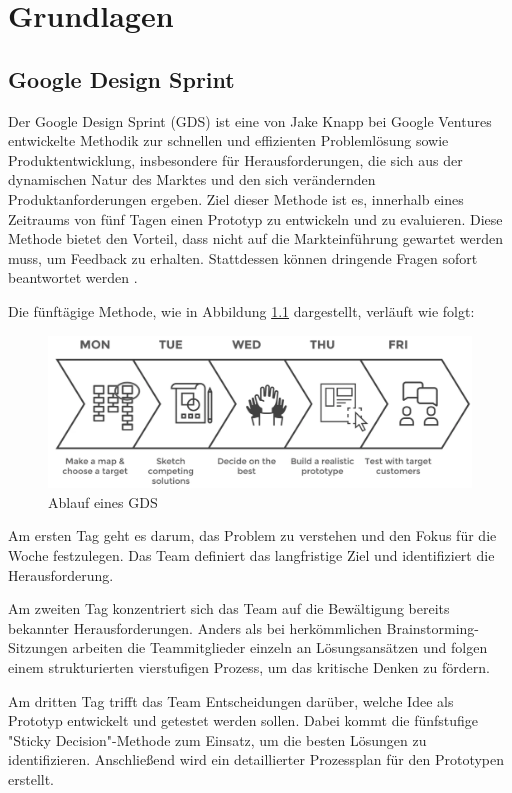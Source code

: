 \chapter{Grundlagen}

\section{Google Design Sprint}

Der Google Design Sprint (GDS) ist eine von Jake Knapp bei Google Ventures entwickelte Methodik zur schnellen und effizienten Problemlösung sowie Produktentwicklung, insbesondere für Herausforderungen, die sich aus der dynamischen Natur des Marktes und den sich verändernden Produktanforderungen ergeben. 
Ziel dieser Methode ist es, innerhalb eines Zeitraums von fünf Tagen einen Prototyp zu entwickeln und zu evaluieren. 
Diese Methode bietet den Vorteil, dass nicht auf die Markteinführung gewartet werden muss, um Feedback zu erhalten. Stattdessen können dringende Fragen sofort beantwortet werden \cite[S.98 f.]{Design_Sprint}.

Die fünftägige Methode, wie in Abbildung \ref{GDS} dargestellt, verläuft wie folgt:

\begin{figure}[h]
    \centering
    \includegraphics[clip,width=0.75\linewidth]{../prefix/image/GDS.png}
    \caption[Ablauf eines GDS]{Ablauf eines GDS \cite{GDS_Abbildung}}
    \label{GDS}
\end{figure}

Am ersten Tag geht es darum, das Problem zu verstehen und den Fokus für die Woche festzulegen. Das Team definiert das langfristige Ziel und identifiziert die Herausforderung. 

Am zweiten Tag konzentriert sich das Team auf die Bewältigung bereits bekannter Herausforderungen. Anders als bei herkömmlichen Brainstorming-Sitzungen arbeiten die Teammitglieder einzeln an Lösungsansätzen und folgen einem strukturierten vierstufigen Prozess, um das kritische Denken zu fördern. 

Am dritten Tag trifft das Team Entscheidungen darüber, welche Idee als Prototyp entwickelt und getestet werden sollen. Dabei kommt die fünfstufige "Sticky Decision"-Methode zum Einsatz, um die besten Lösungen zu identifizieren. Anschließend wird ein detaillierter Prozessplan für den Prototypen erstellt. 

